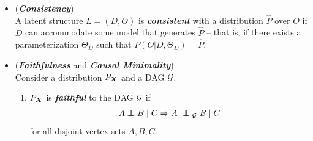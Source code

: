 \documentclass[11pt]{article}
\begin{document}
\begin{itemize}
%


\item \begin{definition} (\textbf{\emph{Consistency}}) \citep{pearl2000causal}\\
A latent structure $L = (D, O)$ is \emph{\textbf{consistent}} with a distribution $\hat{P}$ over $O$ if $D$ can accommodate some model that generates $\hat{P}$ – that is, if there exists a parameterization $\Theta_{D}$ such that $P(O | D, \Theta_{D}) = \hat{P}$.
\end{definition}
%
%
\item  \begin{definition}(\textbf{\emph{Faithfulness}} and \textbf{\emph{Causal Minimality}}) \citep{peters2017elements}\\
Consider a distribution $P_{\boldsymbol{X}}$ and a DAG ${\mathcal G}$.
\begin{enumerate}
\item $P_{\boldsymbol{X}}$ is \textbf{\emph{faithful}} to the DAG ${\mathcal G}$ if
\begin{align*}
A \indep B \;|\; C \Rightarrow A\; \indep_{\cG}\; B\; | \;C
\end{align*}
 for all disjoint vertex sets $A, B, C$.
 

\end{enumerate}
\end{definition}
\end{itemize}
\end{document}
